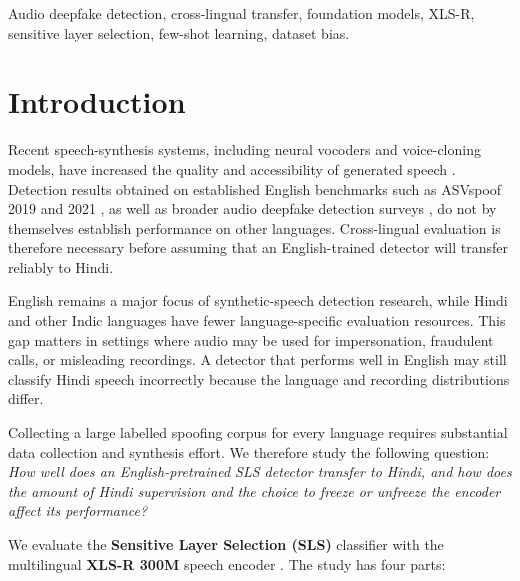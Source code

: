 \documentclass[conference]{IEEEtran}
\begin{document}
\begin{IEEEkeywords}
Audio deepfake detection, cross-lingual transfer, foundation models, XLS-R, sensitive layer selection, few-shot learning, dataset bias.
\end{IEEEkeywords}

\section{Introduction}

Recent speech-synthesis systems, including neural vocoders and voice-cloning models, have increased the quality and accessibility of generated speech \cite{wang2022comparative}. Detection results obtained on established English benchmarks such as ASVspoof 2019 and 2021 \cite{yamagishi2021asvspoof}, as well as broader audio deepfake detection surveys \cite{yi2023survey}, do not by themselves establish performance on other languages. Cross-lingual evaluation is therefore necessary before assuming that an English-trained detector will transfer reliably to Hindi.

English remains a major focus of synthetic-speech detection research, while Hindi and other Indic languages have fewer language-specific evaluation resources. This gap matters in settings where audio may be used for impersonation, fraudulent calls, or misleading recordings. A detector that performs well in English may still classify Hindi speech incorrectly because the language and recording distributions differ.

Collecting a large labelled spoofing corpus for every language requires substantial data collection and synthesis effort. We therefore study the following question: \textit{How well does an English-pretrained SLS detector transfer to Hindi, and how does the amount of Hindi supervision and the choice to freeze or unfreeze the encoder affect its performance?}

We evaluate the \textbf{Sensitive Layer Selection (SLS)} classifier \cite{zhang2024sensitive} with the multilingual \textbf{XLS-R 300M} speech encoder \cite{babu2022xls}. The study has four parts:
\end{document}
